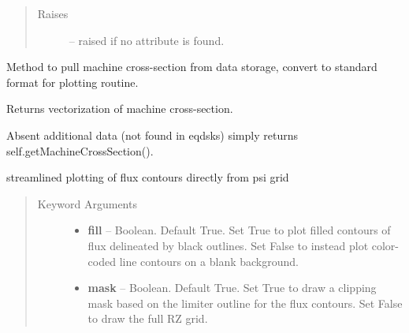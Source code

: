 \documentclass[letterpaper,10pt,english]{sphinxmanual}
\begin{document}
\begin{fulllineitems}
\begin{fulllineitems}
\begin{quote}
\begin{description}
\item[{Raises }] \leavevmode
{} -- 
raised if no attribute is found.

\end{description}\end{quote}

\end{fulllineitems}


\begin{fulllineitems}
\label{eqtools:eqtools.eqdskreader.EqdskReader.getMachineCrossSection}
Method to pull machine cross-section from data storage, convert to standard format for plotting routine.

\end{fulllineitems}


\begin{fulllineitems}
\label{eqtools:eqtools.eqdskreader.EqdskReader.getMachineCrossSectionFull}
Returns vectorization of machine cross-section.

Absent additional data (not found in eqdsks) simply returns self.getMachineCrossSection().

\end{fulllineitems}


\begin{fulllineitems}
\label{eqtools:eqtools.eqdskreader.EqdskReader.plotFlux}
streamlined plotting of flux contours directly from psi grid
\begin{quote}\begin{description}
\item[{Keyword Arguments}] \leavevmode\begin{itemize}
\item {} 
\textbf{fill} --
Boolean.
Default True.  Set True to plot filled contours of flux delineated by black outlines.
Set False to instead plot color-coded line contours on a blank background.

\item {} 
\textbf{mask} --
Boolean.
Default True.  Set True to draw a clipping mask based on the limiter outline for the flux contours.
Set False to draw the full RZ grid.

\end{itemize}

\end{description}\end{quote}

\end{fulllineitems}


\end{fulllineitems}
\end{document}
